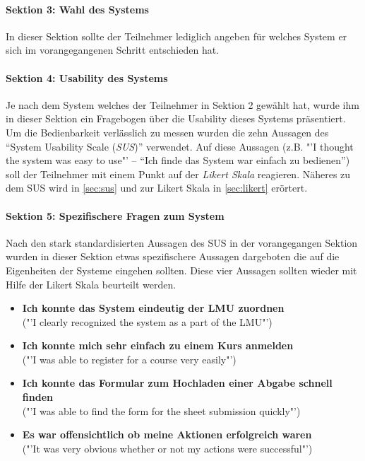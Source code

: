 \documentclass[11pt,a4paper,twoside,ngerman]{article}
\begin{document}
\paragraph{Sektion 3: Wahl des Systems}
In dieser Sektion sollte der Teilnehmer lediglich angeben für welches System er sich im vorangegangenen Schritt entschieden hat.

\paragraph{Sektion 4: Usability des Systems}
Je nach dem System welches der Teilnehmer in Sektion 2 gewählt hat, wurde ihm in dieser Sektion ein Fragebogen über die Usability dieses Systems präsentiert. Um die Bedienbarkeit verlässlich zu messen wurden die zehn Aussagen des "`System Usability Scale
(\emph{SUS})"' verwendet. Auf diese Aussagen (z.B. "'I thought the system was easy to use"' -- "`Ich finde das System war einfach zu bedienen"') soll der Teilnehmer mit einem Punkt auf der \emph{Likert Skala} reagieren. Näheres zu dem SUS wird in \autoref{sec:sus} und zur Likert Skala in \autoref{sec:likert} erörtert.

\paragraph{Sektion 5: Spezifischere Fragen zum System}
Nach den stark standardisierten Aussagen des SUS in der vorangegangen Sektion wurden in dieser Sektion etwas spezifischere Aussagen dargeboten die auf die Eigenheiten der Systeme eingehen sollten. Diese vier Aussagen sollten wieder mit Hilfe der Likert Skala beurteilt werden.

\begin{itemize}
    \item \textbf{Ich konnte das System eindeutig der LMU zuordnen} \\ ("'I clearly recognized the system as a part of the LMU"')
    \item \textbf{Ich konnte mich sehr einfach zu einem Kurs anmelden} \\ ("'I was able to register for a course very easily"')
    \item \textbf{Ich konnte das Formular zum Hochladen einer Abgabe schnell finden} \\ ("'I was able to find the form for the sheet submission quickly"')
    \item \textbf{Es war offensichtlich ob meine Aktionen erfolgreich waren} \\ ("'It was very obvious whether or not my actions were successful"')
\end{itemize}
\end{document}
